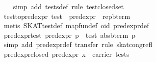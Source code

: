 \begin{isabellebody}
%
\isadelimproof
\ \ %
\endisadelimproof
%
\isatagproof
{}\isamarkupfalse%
\ {}simp\ add{}\ tests{}def{}\ rule\ test{}closed{}set{}%
\endisatagproof
{\isafoldproof}%
%
\isadelimproof
\isanewline
%
\endisadelimproof
\isanewline
{}\isamarkupfalse%
\ test{}to{}pred{}expr{}\ {}test\ {}\ pred{}expr\ {}\ rep{}bterm{}\isanewline
%
\isadelimproof
\ \ %
\endisadelimproof
%
\isatagproof
{}\isamarkupfalse%
\ {}metis\ SKAT{}test{}def\ map{}fun{}def\ o{}id\ pred{}expr{}def{}%
\endisatagproof
{\isafoldproof}%
%
\isadelimproof
\isanewline
%
\endisadelimproof
\isanewline
{}\isamarkupfalse%
\ pred{}expr{}test{}\ {}pred{}expr\ p\ {}\ test\ {}abs{}bterm\ p{}{}\isanewline
%
\isadelimproof
\ \ %
\endisadelimproof
%
\isatagproof
{}\isamarkupfalse%
\ {}simp\ add{}\ pred{}expr{}def{}\ transfer{}\ rule\ skat{}cong{}refl{}%
\endisatagproof
{\isafoldproof}%
%
\isadelimproof
\isanewline
%
\endisadelimproof
\isanewline
{}\isamarkupfalse%
\ pred{}expr{}closed{}\ {}pred{}expr\ x\ {}\ carrier\ tests{}\isanewline

\end{isabellebody}
